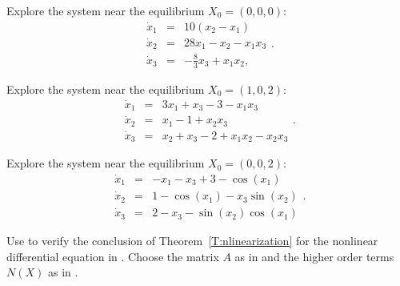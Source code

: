 \documentclass{ximera}
\begin{document}
\begin{exercise} \label{c11.4.1b}
Explore the system  near the equilibrium $X_0 = (0,0,0)$:
\begin{equation*}  \label{e11.4.1b}
\begin{array}{rcl}
\dot{x}_1 & = & 10(x_2-x_1)\\
\dot{x}_2 & = & 28 x_1 - x_2 - x_1x_3\\
\dot{x}_3 & = & -\frac{8}{3} x_3 + x_1x_2,
\end{array}.
\end{equation*}
\end{exercise}

\begin{exercise} \label{c11.4.1c}
Explore the system  near the equilibrium $X_0 = (1,0,2)$:
\begin{equation*}  \label{e11.4.1c}
\begin{array}{rcl}
\dot{x}_1 & = & 3x_1+x_3-3-x_1x_3\\
\dot{x}_2 & = & x_1 - 1 + x_2x_3\\
\dot{x}_3 & = & x_2 + x_3 -2 + x_1 x_2 - x_2 x_3
\end{array}.
\end{equation*}
\end{exercise}

\begin{exercise} \label{c11.4.1d}
Explore the system  near the equilibrium $X_0 = (0,0,2)$:
\begin{equation*}  \label{e11.4.1d}
\begin{array}{rcl}
\dot{x}_1 & = & -x_1-x_3+3-\cos(x_1)\\
\dot{x}_2 & = & 1-\cos(x_1) - x_3\sin(x_2)\\
\dot{x}_3 & = & 2-x_3 - \sin(x_2)\cos(x_1)
\end{array}.
\end{equation*}
\end{exercise}

\begin{exercise} \label{c11.4.7}
Use \Matlab to verify the conclusion of Theorem~\ref{T:nlinearization}
for the nonlinear differential equation in .  Choose
the matrix $A$ as in  and the higher order terms $N(X)$
as in .
\end{exercise}
\end{document}
